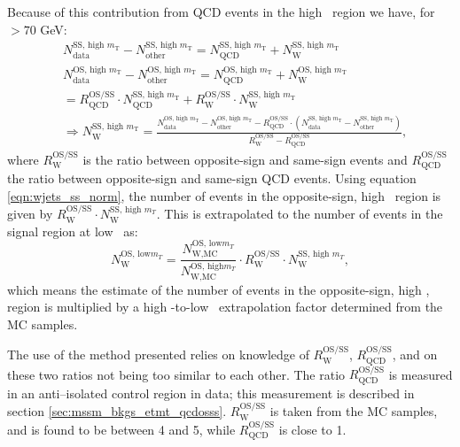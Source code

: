 Because of this contribution from QCD events in the high \mT~region we
have, for \mT$>70$ GeV:
\begin{equation}\label{eqn:wjets_ss_norm}
\begin{split}
&N_{\text{data}}^{\text{SS, high } m_{\text{T}}} - N_{\text{other}}^{\text{SS,
 high } m_{\text{T}}}  =
N_{\text{QCD}}^{\text{SS, high } m_{\text{T}}} + N_{\text{W}}^{\text{SS, high } m_{\text{T}}} ~\\
&N_{\text{data}}^{\text{OS, high } m_{\text{T}}} - N_{\text{other}}^{\text{OS,
 high } m_{\text{T}}}  = N_{\text{QCD}}^{\text{OS, high } m_{\text{T}}} +
N_{\text{W}}^{\text{OS, high } m_{\text{T}}} \\
& = R_{\text{QCD}}^{\text{OS/SS}}\cdot N_{\text{QCD}}^{\text{SS, high } m_{\text{T}}} +
R_{\text{W}}^{\text{OS/SS}} \cdot N_{\text{W}}^{\text{SS, high } m_{\text{T}}} ~\\
&\Rightarrow N_{\text{W}}^{\text{SS, high } m_{\text{T}}}  = \frac{N_{\text{data}}^{\text{OS,
 high } m_{\text{T}}}  - N_{\text{other}}^{\text{OS, high } m_{\text{T}}}  -
R_{\text{QCD}}^{\text{OS/SS}}\cdot(N_{\text{data}}^{\text{SS, high } m_{\text{T}}}  -
N_{\text{other}}^{\text{SS, high } m_{\text{T}}} )}{R_{\text{W}}^{\text{OS/SS}} -
R_{\text{QCD}}^{\text{OS/SS}}} ,
\end{split}
\end{equation}
where $R_{\text{W}}^{\text{OS/SS}}$ is the ratio between opposite-sign and same-sign \Wjets events
and $R_{\text{QCD}}^{\text{OS/SS}}$ the ratio between opposite-sign and same-sign QCD events. Using 
equation \ref{eqn:wjets_ss_norm}, the number of \Wjets events in the
opposite-sign, high \mT~region is given by $R_{\text{W}}^{\text{OS/SS}}\cdot N_{\text{W}}^{\text{SS, high } m_{T}}$. 
This is extrapolated to the number of \Wjets events in the signal region at low \mT~as:
\begin{equation}\label{eqn:wjets_os_norm}
N_{\text{W}}^{\text{OS, low} m_{T}} = \frac{N_{\text{W,MC}}^{\text{OS, low} m_{T}}}{N_{\text{W,MC}}^{\text{OS, high} m_{T}}}\cdot R_{\text{W}}^{\text{OS/SS}} \cdot N_{\text{W}}^{\text{SS, high }m_{T}},
\end{equation}
which means the estimate of the number of \Wjets events in the opposite-sign, high \mT, region
is multiplied by a high \mT-to-low \mT~extrapolation factor determined from the \ac{MC} samples.

The use of the method presented relies on knowledge of $R_{\text{W}}^{\text{OS/SS}}$,
$R_{\text{QCD}}^{\text{OS/SS}}$, and on these two ratios not being too similar to each other. 
The ratio $R_{\text{QCD}}^{\text{OS/SS}}$ is measured in an anti--isolated
control region in data; this measurement is described in section \ref{sec:mssm_bkgs_etmt_qcdosss}. $R_{\text{W}}^{\text{OS/SS}}$ is 
taken from the \Wjets \ac{MC} samples, and is found to be between 4 and 5, while $R_{\text{QCD}}^{\text{OS/SS}}$
is close to 1.

